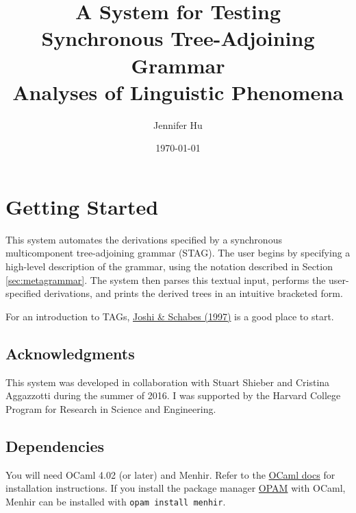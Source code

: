 \documentclass[10.5pt]{article}
\title{A System for Testing\\Synchronous Tree-Adjoining Grammar\\Analyses of Linguistic Phenomena}
\author{Jennifer Hu}
\date{\today}
\newcommand{\code}[1]{\texttt{#1}}
\begin{document}
\maketitle

\tableofcontents

\newpage

\section{Getting Started}

This system automates the derivations specified by a synchronous multicomponent tree-adjoining grammar (STAG). The user begins by specifying a high-level description of the grammar, using the notation described in Section \ref{sec:metagrammar}. The system then parses this textual input, performs the user-specified derivations, and prints the derived trees in an intuitive bracketed form.

For an introduction to TAGs, \href{http://www.seas.upenn.edu/~cis477/ltag-paper.pdf}{Joshi \& Schabes (1997)} is a good place to start.

\subsection{Acknowledgments}
This system was developed in collaboration with Stuart Shieber and Cristina Aggazzotti during the summer of 2016. I was supported by the Harvard College Program for Research in Science and Engineering.

\subsection{Dependencies}
You will need OCaml 4.02 (or later) and Menhir. Refer to the \href{https://ocaml.org/docs/install.html}{OCaml docs} for installation instructions. If you install the package manager \href{https://opam.ocaml.org/}{OPAM} with OCaml, Menhir can be installed with
\code{opam install menhir}.
\end{document}
